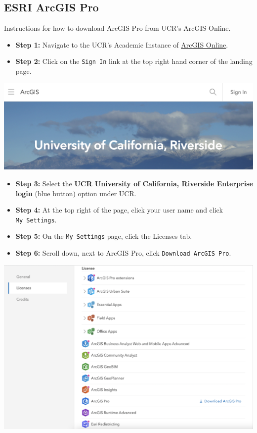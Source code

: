 \documentclass[
]{book}
\begin{document}
\hypertarget{esri-arcgis-pro}{%
\subsection{ESRI ArcGIS Pro}\label{esri-arcgis-pro}}

Instructions for how to download ArcGIS Pro from UCR's ArcGIS Online.

\begin{itemize}
\item
  \textbf{Step 1:} Navigate to the UCR's Academic Instance of \href{https://ucr.maps.arcgis.com/home/index.html}{ArcGIS Online}.
\item
  \textbf{Step 2:} Click on the \texttt{Sign\ In} link at the top right hand corner of the landing page.
\end{itemize}

\begin{center}\includegraphics[width=0.75\linewidth]{images/esri_signin} \end{center}

\begin{itemize}
\item
  \textbf{Step 3:} Select the \textbf{UCR University of California, Riverside Enterprise login} (blue button) option under UCR.
\item
  \textbf{Step 4:} At the top right of the page, click your user name and click \texttt{My\ Settings}.
\item
  \textbf{Step 5:} On the \texttt{My\ Settings} page, click the Licenses tab.
\item
  \textbf{Step 6:} Scroll down, next to ArcGIS Pro, click \texttt{Download\ ArcGIS\ Pro}.
\end{itemize}

\begin{center}\includegraphics[width=0.75\linewidth]{images/esri_pro} \end{center}
\end{document}
